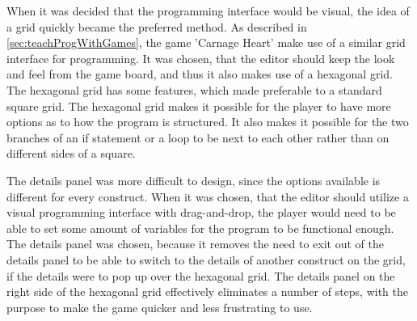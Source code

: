 When it was decided that the programming interface would be visual, the idea of a grid quickly became the preferred method.
As described in \autoref{sec:teachProgWithGames}, the game 'Carnage Heart' make use of a similar grid interface for programming.
It was chosen, that the editor should keep the look and feel from the game board, and thus it also makes use of a hexagonal grid.
The hexagonal grid has some features, which made preferable to a standard square grid.
The hexagonal grid makes it possible for the player to have more options as to how the program is structured.
It also makes it possible for the two branches of an if statement or a loop to be next to each other rather than on different sides of a square.\newline

The details panel was more difficult to design, since the options available is different for every construct.
When it was chosen, that the editor should utilize a visual programming interface with drag-and-drop, the player would need to be able to set some amount of variables for the program to be functional enough.
The details panel was chosen, because it removes the need to exit out of the details panel to be able to switch to the details of another construct on the grid, if the details were to pop up over the hexagonal grid.
The details panel on the right side of the hexagonal grid effectively eliminates a number of steps, with the purpose to make the game quicker and less frustrating to use.
